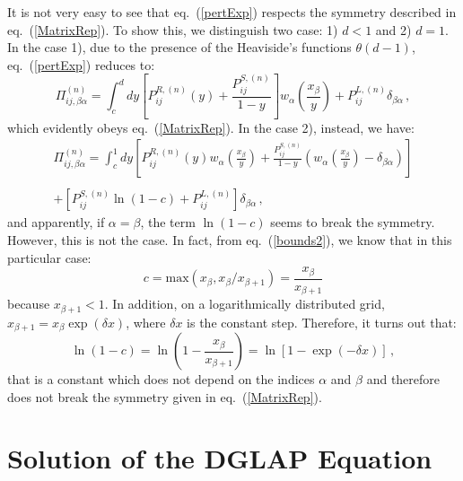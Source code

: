\documentclass[10pt,a4paper]{article}
\begin{document}
It is not very easy to see that eq.~(\ref{pertExp}) respects the symmetry described in eq.~(\ref{MatrixRep}). To show this, we distinguish two case: 1) $d < 1$ and 2) $d = 1$. In the case 1), due to the presence of the Heaviside's functions $\theta(d-1)$, eq.~(\ref{pertExp}) reduces to:
\begin{equation}\label{pertExp2}
\Pi_{ij,\beta\alpha}^{(n)} = \int^{d}_{c}dy\left[{P}_{ij}^{R,(n)}(y)+\frac{{P}_{ij}^{S,(n)}}{1-y}\right]w_{\alpha}\left(\frac{x_\beta}{y}\right) + {P}_{ij}^{L,(n)}\delta_{\beta\alpha}\,,
\end{equation}
which evidently obeys eq.~(\ref{MatrixRep}). In the case 2), instead, we have:
\begin{equation}\label{pertExp3}
\begin{array}{c}
\displaystyle \Pi_{ij,\beta\alpha}^{(n)} = \int^{1}_{c}dy\left[{P}_{ij}^{R,(n)}(y)w_{\alpha}\left(\frac{x_\beta}{y}\right)+\frac{{P}_{ij}^{S,(n)}}{1-y}\left(w_{\alpha}\left(\frac{x_\beta}{y}\right)-\delta_{\beta\alpha}\right)\right]\\
\\
\displaystyle +\left[{P}_{ij}^{S,(n)}\ln(1-c)+{P}_{ij}^{L,(n)}\right]\delta_{\beta\alpha}\,,
\end{array}
\end{equation}
and apparently, if $\alpha=\beta$, the term $\ln(1-c)$ seems to break the symmetry. However, this is not the case. In fact, from eq.~(\ref{bounds2}), we know that in this particular case:
\begin{equation}
c = \mbox{max}(x_\beta,x_\beta/x_{\beta+1}) = \frac{x_\beta}{x_{\beta+1}}
\end{equation}
because $x_{\beta+1}<1$. In addition, on a logarithmically distributed grid, $x_{\beta+1}=x_{\beta}\exp(\delta x)$, where $\delta x$ is the constant step. Therefore, it turns out that:
\begin{equation}
\ln(1-c) = \ln\left(1-\frac{x_{\beta}}{x_{\beta+1}}\right) = \ln[1 - \exp(-\delta x)]\,,
\end{equation}
that is a constant which does not depend on the indices $\alpha$ and $\beta$ and therefore does not break the symmetry given in eq.~(\ref{MatrixRep}).


\section{Solution of the DGLAP Equation}
\end{document}
